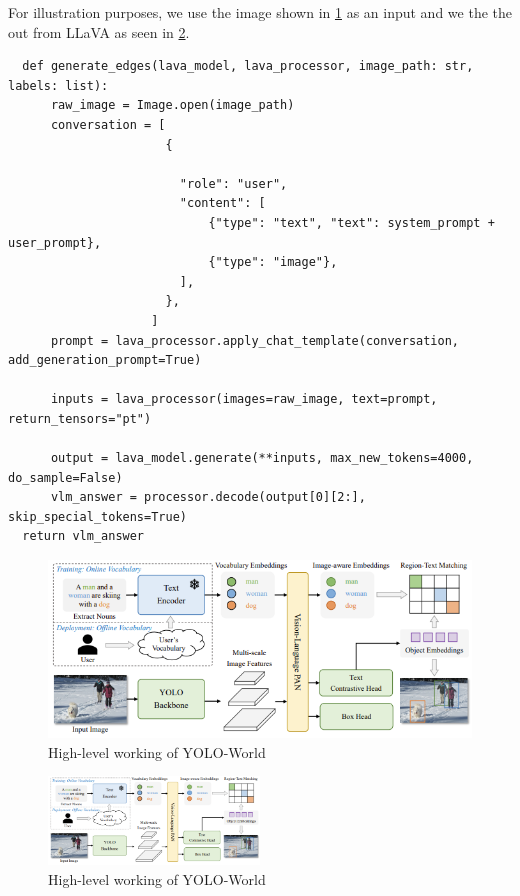 For illustration purposes, we use the image shown in \cref{fig:llava1} as an input and we the the out from LLaVA as seen in \cref{fig:llava2}. 
\begin{lstlisting}
  def generate_edges(lava_model, lava_processor, image_path: str, labels: list):
      raw_image = Image.open(image_path) 
      conversation = [
                      {

                        "role": "user",
                        "content": [
                            {"type": "text", "text": system_prompt + user_prompt},
                            {"type": "image"},
                        ],
                      },
                    ]
      prompt = lava_processor.apply_chat_template(conversation, add_generation_prompt=True)

      inputs = lava_processor(images=raw_image, text=prompt, return_tensors="pt")

      output = lava_model.generate(**inputs, max_new_tokens=4000, do_sample=False)
      vlm_answer = processor.decode(output[0][2:], skip_special_tokens=True)
  return vlm_answer
\end{lstlisting}

\begin{figure}[ht!]
  \centering
  \includegraphics[width=\textwidth]{content/images/YOLOWorld.png}
  \caption{High-level working of YOLO-World \cite{cheng2024yolow}}
  \label{fig:llava1}
\end{figure}

\begin{figure}[ht!]
  \centering
  \includegraphics[width=0.5\textwidth]{content/images/YOLOWorld.png}
  \caption{High-level working of YOLO-World \cite{cheng2024yolow}}
  \label{fig:llava2}
\end{figure}
